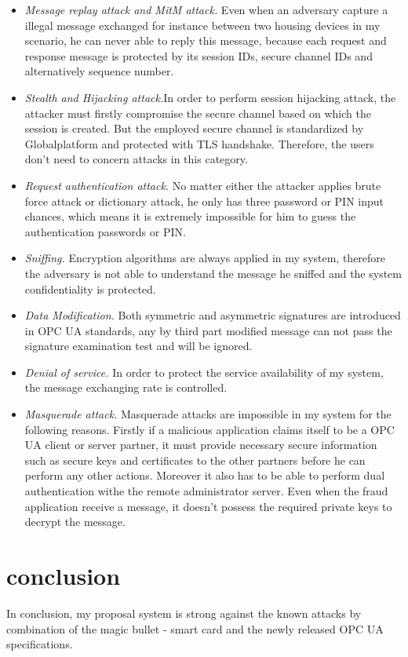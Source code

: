 \begin{itemize}
\item \emph{Message replay attack and MitM attack.} Even when an adversary capture a illegal message  exchanged for instance between two housing devices in my scenario, he can never able to reply this message, because each request and response message is protected by its  session IDs, secure channel IDs and alternatively sequence number.
\item \emph{Stealth and Hijacking attack.}In order to perform session hijacking attack, the attacker must firstly compromise the secure channel based on which the session is created. But the employed secure  channel is standardized by Globalplatform and protected with TLS handshake. Therefore, the users don't need to concern attacks in this category.
\item \emph{Request authentication attack.} No matter either the attacker applies brute force attack  or dictionary attack, he only has three password or PIN input chances, which means it is extremely impossible for him to guess the authentication passwords or PIN.
\item \emph{Sniffing.} Encryption algorithms are always  applied in my system, therefore the adversary is not  able to understand  the message he sniffed and the system confidentiality is protected.
\item \emph{Data Modification.} Both  symmetric and asymmetric  signatures are introduced in OPC UA standards, any by third part modified message can not pass the signature examination test and will be ignored.
\item \emph{Denial of service.} In order to protect  the service availability of my system, the message  exchanging rate is controlled. 
\item \emph{Masquerade attack.} Masquerade attacks are impossible in my system for the following reasons. Firstly if a malicious application claims itself to be a OPC UA client or server partner, it must provide necessary secure information such as secure keys and certificates to the other partners before he can perform any other actions. Moreover it also has to be able to perform dual authentication withe the remote administrator server. Even when the fraud application receive a message, it doesn't possess the required  private keys to decrypt the message. 
\end{itemize}

\section{conclusion}
In conclusion, my proposal  system is strong against  the known attacks by combination of the magic bullet - smart card and the newly released OPC UA specifications. 

